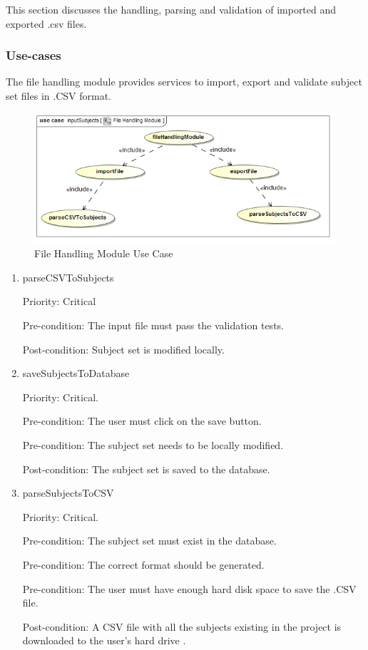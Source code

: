 This section discusses the handling, parsing and validation of imported and exported .csv files.\par
\subsubsection{Use-cases}
The file handling module provides services to import, export and validate subject set files in .CSV format.\par
\begin{figure}[H]
    \centering
    \includegraphics[width=15cm]{./graphics/fileUseCase.jpg}
    \caption{File Handling Module Use Case}
\end{figure}
\begin{enumerate}
\item parseCSVToSubjects\par
Priority: Critical\par
Pre-condition: The input file must pass the validation tests.\par
Post-condition: Subject set is modified locally.\par
\item saveSubjectsToDatabase\par
Priority: Critical.\par
Pre-condition: The user must click on the save button.\par
Pre-condition: The subject set needs to be locally modified.\par
Post-condition: The subject set is saved to the database.\par
\item parseSubjectsToCSV\par
Priority: Critical.\par
Pre-condition: The subject set must exist in the database.\par
Pre-condition: The correct format should be generated.\par
Pre-condition: The user must have enough hard disk space to save the .CSV file.\par
Post-condition: A CSV file with all the subjects existing in the project is downloaded to the user's hard drive .\par

\end{enumerate}